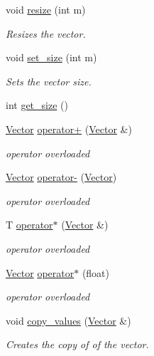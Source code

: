\begin{DoxyCompactItemize}
void \hyperlink{class_vector_ad3e66cc314446ce3418ef8792fdc3b5d}{resize} (int m)
\begin{DoxyCompactList}\small\item\em Resizes the vector. \end{DoxyCompactList}\item 
void \hyperlink{class_vector_a7cc3be793f521e901f153f756d8f03a3}{set\+\_\+size} (int m)
\begin{DoxyCompactList}\small\item\em Sets the vector size. \end{DoxyCompactList}\item 
int \hyperlink{class_vector_a7e3c8454662725ab7a7d3ad64b8b0eb1}{get\+\_\+size} ()
\item 
\hyperlink{class_vector}{Vector} \hyperlink{class_vector_ad3b8980f88923b6aac44bd65a093dc69}{operator+} (\hyperlink{class_vector}{Vector} \&)
\begin{DoxyCompactList}\small\item\em operator overloaded \end{DoxyCompactList}\item 
\hyperlink{class_vector}{Vector} \hyperlink{class_vector_af43adb2f0f503c4a017e61b0647eeb89}{operator-\/} (\hyperlink{class_vector}{Vector})
\begin{DoxyCompactList}\small\item\em operator overloaded \end{DoxyCompactList}\item 
T \hyperlink{class_vector_a03931ccfca226e46710a8c395b62b292}{operator$\ast$} (\hyperlink{class_vector}{Vector} \&)
\begin{DoxyCompactList}\small\item\em operator overloaded \end{DoxyCompactList}\item 
\hyperlink{class_vector}{Vector} \hyperlink{class_vector_a6185df9d22ec80546e72fb52d17a4893}{operator$\ast$} (float)
\begin{DoxyCompactList}\small\item\em operator overloaded \end{DoxyCompactList}\item 
void \hyperlink{class_vector_a25f4c7dc716b4971d37a9354df16f4fb}{copy\+\_\+values} (\hyperlink{class_vector}{Vector} \&)
\begin{DoxyCompactList}\small\item\em Creates the copy of of the vector. \end{DoxyCompactList}\item 

\end{DoxyCompactItemize}
